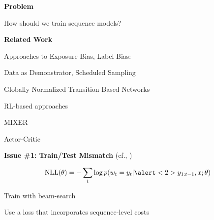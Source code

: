 \documentclass{beamer}
\let\tempone\itemize
\let\temptwo\enditemize
\renewenvironment{itemize}{\tempone\addtolength{\itemsep}{0.5\baselineskip}}{\temptwo}
\newcommand{\air}{\vspace{0.25cm}}
\newcommand{\Cite}[1]{{\footnotesize \citep{#1}}}
\begin{document}
 \begin{frame}
   \begin{center}
     \textbf{Problem}
   \end{center}


     How should we train sequence models?
     
     \pause
   \begin{center}
     \textbf{Related Work}
   \end{center}
   \begin{itemize}
   \item Approaches to Exposure Bias, Label Bias:
  \begin{itemize}
  \item Data as Demonstrator, Scheduled Sampling \citep{Venkatraman,bengio15scheduled}
  \item Globally Normalized Transition-Based Networks \citep{Andor2016}
  \end{itemize}
  \air
  \item RL-based approaches
  \begin{itemize}
  \item MIXER \citep{ranzato16sequence}
  \item Actor-Critic \citep{Bahdanau2016}
  \end{itemize}
  \air
\end{itemize}
 \end{frame}


\begin{frame}

  \begin{center}
    \textbf{\alert{Issue \#1}: Train/Test Mismatch} (cf.,
    \Cite{ranzato16sequence})
  \end{center}
\air
\begin{align*}
\text{NLL}(\theta) = -\sum_{t} \log p(w_{t} = y_t | \alert<2>{y_{1:t-1}}, x; \theta) 
\end{align*}


\air
\air
\air
\textbf{} Train with beam-search
\air
\begin{itemize}
\item Use a loss that incorporates sequence-level costs
\end{itemize}


\end{frame}
\end{document}
